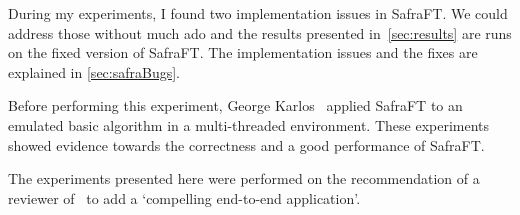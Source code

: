 During my experiments, I found two implementation issues in SafraFT.
We could address those without much ado and the results presented in~\cref{sec:results} are runs on the fixed version of SafraFT.
The implementation issues and the fixes are explained in \cref{sec:safraBugs}.

Before performing this experiment, George Karlos~\cite{karlos} applied SafraFT to an emulated basic algorithm in a multi-threaded environment.
These experiments showed evidence towards the correctness and a good performance of SafraFT.

The experiments presented here were performed on the recommendation of a reviewer of~\cite{safraFT2018} to add a `compelling end-to-end application'.
